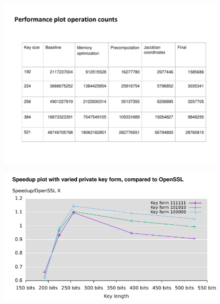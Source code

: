 \begin{frame}
\begin{figure}\flushleft		
\includegraphics[scale=0.4, trim={0 0 0 0}]{tablewithtitle}		
\end{figure}
\end{frame}
\begin{frame}
\begin{figure}\flushleft		
\includegraphics[scale=0.9, trim={0 0 0 0}]{keysize}		
\end{figure}
\end{frame}